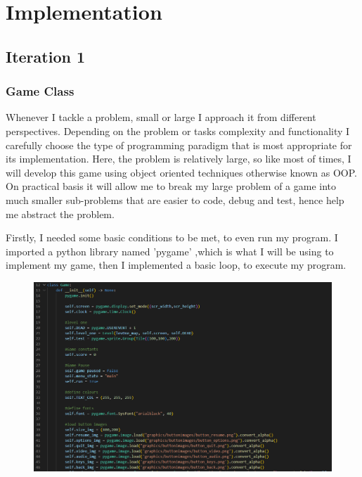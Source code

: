 \documentclass[12pt]{article}
\begin{document}
\section{Implementation}
\subsection{Iteration 1}
\subsubsection{Game Class}
Whenever I tackle a problem, small or large I approach it from different perspectives. Depending on the problem or tasks complexity and functionality I carefully choose the type of programming paradigm that is most appropriate for its implementation. Here, the problem is relatively large, so like most of times, I will develop this game using object oriented techniques otherwise known as OOP. On practical basis it will allow me to break my large problem of a game into much smaller sub-problems that are easier to code, debug and test, hence help me abstract the problem.

Firstly, I needed some basic conditions to be met, to even run my program.
I imported a python library named 'pygame' ,which is what I will be using to implement my game, then I implemented a basic loop, to execute my program.
\newpage

\begin{figure}[H]
\begin{center}
    \includegraphics[width = 18cm]{game class/main1.PNG}
    \centering
\end{center}
\end{figure}\\
\end{document}
